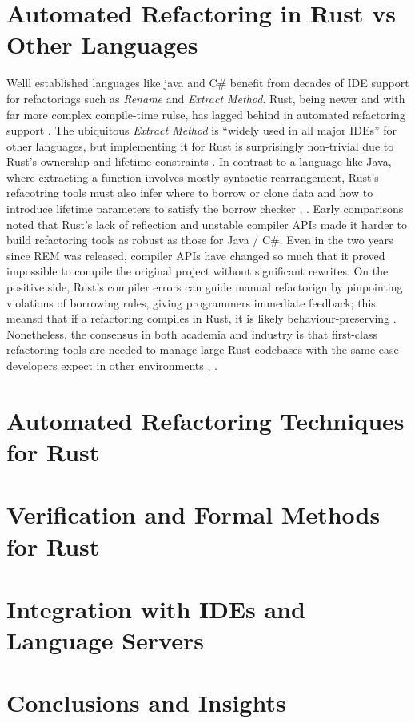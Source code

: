 \section{Automated Refactoring in Rust vs Other Languages}
\label{sec:automated_ref_rust_vs_other}
Welll established languages like java and C\# benefit from decades of IDE
support for refactorings such as \textit{Rename} and \textit{Extract Method}.
Rust, being newer and with far more complex compile-time rulse, has lagged
behind in automated refactoring support \cite{AdventureOfALifetime}. The
ubiquitous \textit{Extract Method} is ``widely used in all major IDEs'' for
other languages, but implementing it for Rust is surprisingly non-trivial due to
Rust's ownership and lifetime constraints \cite{AdventureOfALifetime}. In
contrast to a language like Java, where extracting a function involves mostly
syntactic rearrangement, Rust's refacotring tools must also infer where to
borrow or clone data and how to introduce lifetime parameters to satisfy the
borrow checker \cite{automated_refactoring_of_rust_programs},
\cite{automatically_enforcing_rust_trait_properties}. Early comparisons noted
that Rust's lack of reflection and unstable compiler APIs made it harder to
build refactoring tools as robust as those for Java / C\#. Even in the two years
since REM was released, compiler APIs have changed so much that it proved
impossible to compile the original project without significant rewrites. On the
positive side, Rust's compiler errors can guide manual refactorign by
pinpointing violations of borrowing rules, giving programmers immediate
feedback; this meansd that if a refactoring compiles in Rust, it is likely
behaviour-preserving \cite{Endler_2024}. Nonetheless, the consensus in both
academia and industry is that first-class refactoring tools are needed to manage
large Rust codebases with the same ease developers expect in other environments
\cite{AdventureOfALifetime}, \cite{OneThousandOneStories-SoftwareRefactoring}. 
\section{Automated Refactoring Techniques for Rust}
\label{sec:automated_ref_tech_rust}

\section{Verification and Formal Methods for Rust}
\label{sec:verification_formal_methods}

\section{Integration with IDEs and Language Servers}
\label{sec:integration_language_server}

\section{Conclusions and Insights}\
\label{sec:lit_concusions}

\renewcommand\thefigure{\thechapter .\arabic{figure}}